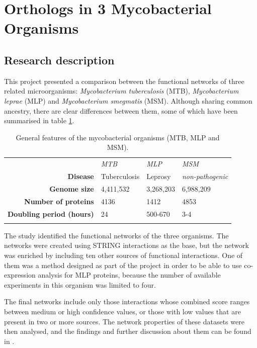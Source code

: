 \section{Orthologs in 3 Mycobacterial Organisms}\label{sec:orthologs}
\subsection{Research description}
This project presented a comparison between the functional networks of three related microorganisms: \emph{Mycobacterium tuberculosis} (MTB), \emph{Mycobacterium leprae} (MLP) and \emph{Mycobacterium smegmatis} (MSM). Although sharing common ancestry, there are clear differences between them, some of which have been summarised in table \ref{tab:orthologs}.

\begin{table}[!ht]
\centering
        \caption{General features of the mycobacterial organisms (MTB, MLP and MSM).}
        \begin{tabular}{ r | l | l | l }
 \rowcolor{table_header}
 & \emph{MTB} & \emph{MLP} & \emph{MSM}\\
 \rowcolor{row_odd}
\textbf{Disease} & Tuberculosis & Leprosy & \emph{non-pathogenic}\\
 \rowcolor{row_even}
\textbf{Genome size} & 4,411,532 & 3,268,203 & 6,988,209\\
 \rowcolor{row_odd}
\textbf{Number of proteins} & 4136 & 1412 & 4853\\
 \rowcolor{row_even}
\textbf{Doubling period (hours)} & 24  & 500-670 & 3-4 \\
 \rowcolor{row_odd}
        \end{tabular}
        \label{tab:orthologs}
\end{table}

The study identified the functional networks of the three organisms. The networks were created using STRING interactions as the base, but the network was enriched by including ten other sources of functional interactions. One of them was a method designed as part of the project in order to be able to use co-expression analysis for MLP proteins, because the number of available experiments in this organism was limited to four.

The final networks include only those interactions whose combined score ranges between medium or high confidence values, or those with low values that are present in two or more sources.  The network properties of these datasets were then analysed, and the findings and further discussion about them can be found in \cite{AKI2013}.

